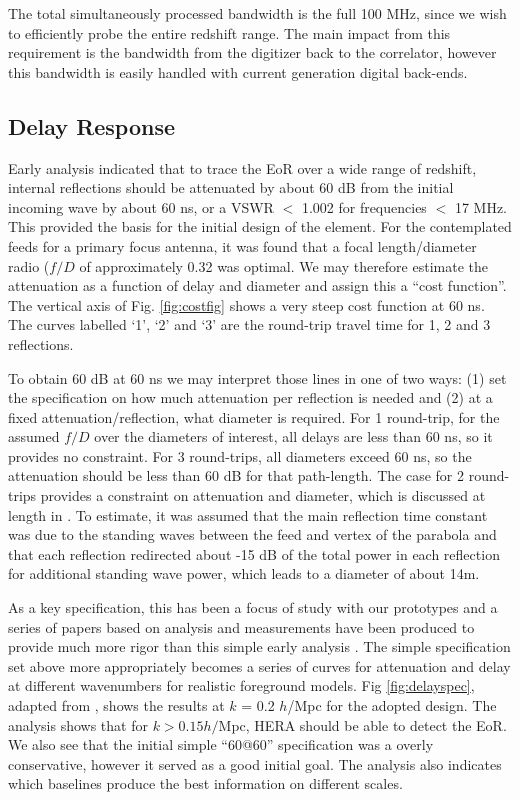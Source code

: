 \documentclass[preprint,11pt]{aastex}
\begin{document}
The total simultaneously processed bandwidth is the full 100 MHz, since we wish to efficiently probe the entire redshift range.  The main impact from this requirement is the bandwidth from the digitizer back to the correlator, however this bandwidth is easily handled with current generation digital back-ends.

\subsection{Delay Response}
\label{sec:delayspec}
Early analysis \citep{elementmemo} indicated that to trace the EoR over a wide range of redshift, internal reflections should be attenuated by about 60 dB from the initial incoming wave by about 60 ns, or a VSWR $<$ 1.002 for frequencies $<$ 17 MHz.  This provided the basis for the initial design of the element.    For the contemplated feeds for a primary focus antenna, it was found that a focal length/diameter radio ($f/D$ of approximately 0.32 was optimal.  We may therefore estimate the attenuation as a function of delay and diameter and assign this a ``cost function''.  The vertical axis of Fig. \ref{fig:costfig} shows a very steep cost function at 60 ns.  The curves labelled `1', `2' and `3' are the round-trip travel time for 1, 2 and 3 reflections.  

To obtain 60 dB at 60 ns we may interpret those lines in one of two ways:  (1) set the specification on how much attenuation per reflection is needed and (2) at a fixed attenuation/reflection, what diameter is required.  For 1 round-trip, for the assumed $f/D$ over the diameters of interest, all delays are less than 60 ns, so it provides no constraint.  For
3 round-trips, all diameters exceed 60 ns, so the attenuation should be less than 60 dB for that path-length.  The case for 2 round-trips provides a constraint on attenuation and diameter, which is discussed at length in \cite{elementmemo}.
To estimate, it was assumed that the main reflection time constant was due to the standing waves between the feed and vertex of the parabola and that each reflection redirected about -15 dB of the total power in each reflection for additional standing wave power, which leads to a diameter of about 14m.

As a key specification, this has been a focus of study with our prototypes and a series of papers based on analysis and measurements have been produced to provide much more rigor than this simple early analysis \citep{ewall-wice_et_al2016-EoXLimits,neben_et_al2016,thyagarajan_et_al2016,patra_et_al0216}.  The simple specification set above more appropriately becomes a series of curves for attenuation and delay at different wavenumbers for realistic foreground models.  Fig \ref{fig:delayspec}, adapted from \cite{thyagarajan_et_al2016}, shows the results at $k$ = 0.2 $h$/Mpc for the adopted design.  The analysis shows that for $k>0.15 h/$Mpc, HERA should be able to detect the EoR.  We also see that the initial simple ``60@60'' specification was a overly conservative, however it served as a good initial goal.  The analysis also indicates which baselines produce the best information on different scales.
\end{document}
